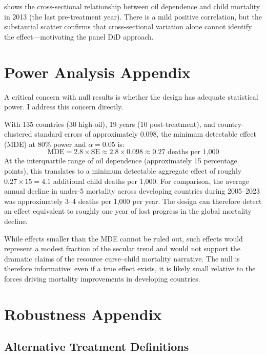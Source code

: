 \documentclass[12pt]{article}
\begin{document}
 shows the cross-sectional relationship between oil dependence and child mortality in 2013 (the last pre-treatment year). There is a mild positive correlation, but the substantial scatter confirms that cross-sectional variation alone cannot identify the effect---motivating the panel DiD approach.


\section{Power Analysis Appendix}
\label{app:power}

A critical concern with null results is whether the design has adequate statistical power. I address this concern directly.

With 135 countries (30 high-oil), 19 years (10 post-treatment), and country-clustered standard errors of approximately 0.098, the minimum detectable effect (MDE) at 80\% power and $\alpha = 0.05$ is:
\begin{equation}
\text{MDE} = 2.8 \times \text{SE} \approx 2.8 \times 0.098 \approx 0.27 \text{ deaths per 1,000}
\end{equation}
At the interquartile range of oil dependence (approximately 15 percentage points), this translates to a minimum detectable aggregate effect of roughly $0.27 \times 15 = 4.1$ additional child deaths per 1,000. For comparison, the average annual decline in under-5 mortality across developing countries during 2005--2023 was approximately 3--4 deaths per 1,000 per year. The design can therefore detect an effect equivalent to roughly one year of lost progress in the global mortality decline.

While effects smaller than the MDE cannot be ruled out, such effects would represent a modest fraction of the secular trend and would not support the dramatic claims of the resource curse--child mortality narrative. The null is therefore informative: even if a true effect exists, it is likely small relative to the forces driving mortality improvements in developing countries.


\section{Robustness Appendix}
\label{app:robustness}

\subsection{Alternative Treatment Definitions}
\end{document}
